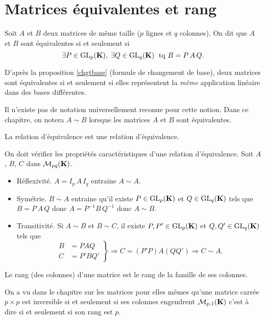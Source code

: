 \section{Matrices équivalentes et rang}
\begin{defi}
Soit $A$ et $B$ deux matrices de même taille ($p$ lignes et $q$ colonnes). On dit que $A$ et $B$ sont équivalentes si et seulement si 
\[
 \exists P\in \text{GL}_p(\mathbf{K}),\;\exists Q\in \text{GL}_q(\mathbf{K})\;\text{ tq } B = P\, A\, Q.
\]
\end{defi}
\begin{rem}
  D'après la proposition \ref{chgtbase} (formule de changement de base), deux matrices sont équivalentes si et seulement si elles représentent la \emph{même} application linéaire dans des bases différentes.
\end{rem}
Il n'existe pas de notation universellement reconue pour cette notion. Dans ce chapitre, on notera $A \sim B$ lorsque les matrices $A$ et $B$ sont équivalentes.
\begin{propn}
La relation d'équivalence est une relation d'équivalence. 
\end{propn}
\begin{demo}
On doit vérifier les propriétés caractéristiques d'une relation d'équivalence. Soit $A$, $B$, $C$ dans $\mathcal{M}_{p q}(\mathbf{K})$.
\begin{itemize}
 \item Réflexivité. $A = I_p\, A\, I_q$ entraine $A \sim A$.
 \item Symétrie. $B \sim A$ entraine qu'il existe $P \in \text{GL}_p(\mathbf{K})$ et $Q \in \text{GL}_q(\mathbf{K})$ tels que $B = P\, A \, Q$ donc $A = P^{-1}B\, Q^{-1}$ donc $A \sim B$. 
 \item Transitivité. Si $A\sim B$ et $B \sim C$, il existe $P, P' \in \text{GL}_p(\mathbf{K})$ et $Q,Q' \in \text{GL}_q(\mathbf{K})$ tels que
\[
 \left. 
 \begin{aligned}
  B &= P A Q \\ C &= P' B Q'
 \end{aligned}
\right\rbrace \Rightarrow C = (P'P) A (QQ') \Rightarrow C \sim A.
\]
\end{itemize}
\end{demo}

\begin{defi}
Le rang (des colonnes) d'une matrice est le rang de la famille de ses colonnes.  
\end{defi}
\begin{rem}
 On a vu dans le chapitre sur les matrices pour elles mêmes qu'une matrice carrée $p \times p$ est inversible si et seulement si ses colonnes engendrent $\mathcal{M}_{p,1}(\mathbf{K})$ c'est à dire si et seulement si son rang est $p$.
\end{rem}

